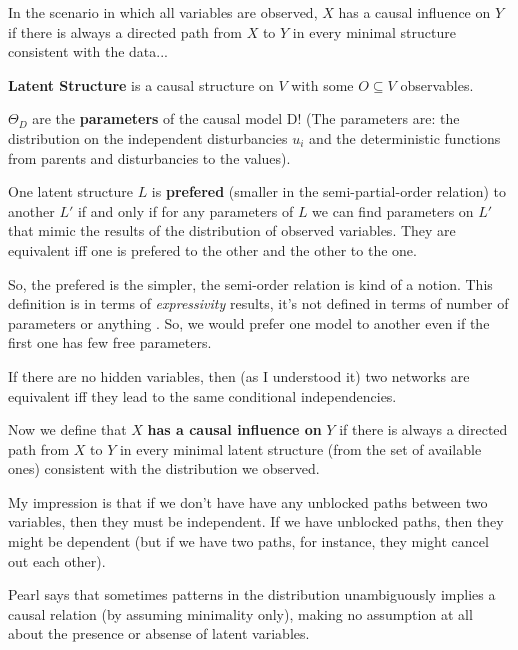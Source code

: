 In the scenario in which all variables are observed, $X$ has a causal influence on $Y$ if there is always a directed path from $X$ to $Y$ in every minimal structure consistent with the data...

\textbf{Latent Structure} is a causal structure on $V$ with some $O \subseteq V$ observables.

$\Theta_D$ are the \textbf{parameters} of the causal model D! (The parameters are: the distribution on the independent disturbancies $u_i$ and the deterministic functions from parents and disturbancies to the values).

One latent structure $L$ is \textbf{prefered} (smaller in the semi-partial-order relation) to another $L'$ if and only if for any parameters of $L$ we can find parameters on $L'$ that mimic the results of the distribution of observed variables. They are equivalent iff one is prefered to the other and the other to the one.

So, the prefered is the simpler, the semi-order relation is kind of a  notion. This definition is in terms of \textit{expressivity} results, it's not defined in terms of number of parameters or anything . So, we would prefer one model to another even if the first one has few free parameters.

If there are no hidden variables, then (as I understood it) two networks are equivalent iff they lead to the same conditional independencies. 

Now we define that $X$ \textbf{has a causal influence on} $Y$ if there is always a directed path from $X$ to $Y$ in every minimal latent structure (from the set of available ones) consistent with the distribution we observed.

My impression is that if we don't have have any unblocked paths between two variables, then they must be independent. If we have unblocked paths, then they might be dependent (but if we have two paths, for instance, they might cancel out each other).

Pearl says that sometimes patterns in the distribution unambiguously implies a causal relation (by assuming minimality only), making no assumption at all about the presence or absense of latent variables.
